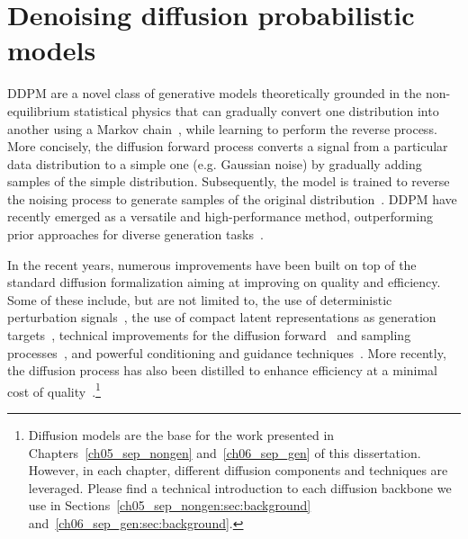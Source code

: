 \section{Denoising diffusion probabilistic models}\label{ch02_sb:sec:ddpm}
\acrshort{DDPM} are a novel class of generative models theoretically grounded in the non-equilibrium statistical physics that can gradually convert one distribution into another using a Markov chain~\citep{dickstein-thermodynamics}, while learning to perform the reverse process. More concisely, the diffusion forward process converts a signal from a particular data distribution to a simple one (e.g. Gaussian noise) by gradually adding samples of the simple distribution. Subsequently, the model is trained to reverse the noising process to generate samples of the original distribution~\citep{ho-diffusion}. \acrshort{DDPM} have recently emerged as a versatile and high-performance method, outperforming prior approaches for diverse generation tasks~\citep{dhariwal-diffusion}.


In the recent years, numerous improvements have been built on top of the standard diffusion formalization aiming at improving on quality and efficiency. Some of these include, but are not limited to, the use of deterministic perturbation signals~\citep{arpit-cold_diffusion}, the use of compact latent representations as generation targets~\citep{rombach-highresolution}, technical improvements for the diffusion forward~\citep{song-ddim} and sampling processes~\citep{salimans-progressive}, and powerful conditioning and guidance techniques~\citep{serra-universe,zhang-controlnet,bansal-universal_guidance,guo-gradient_guidance}. More recently, the diffusion process has also been distilled to enhance efficiency at a minimal cost of quality~\citep{song-consistency,zhou-diffusion_distillation}.\footnote{Diffusion models are the base for the work presented in Chapters~\ref{ch05_sep_nongen} and~\ref{ch06_sep_gen} of this dissertation. However, in each chapter, different diffusion components and techniques are leveraged. Please find a technical introduction to each diffusion backbone we use in Sections~\ref{ch05_sep_nongen:sec:background} and~\ref{ch06_sep_gen:sec:background}.}


